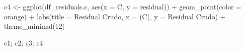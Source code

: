 \documentclass[
  letterpaper,
  DIV=11,
  numbers=noendperiod]{scrartcl}
\newenvironment{Shaded}{\begin{snugshade}}{\end{snugshade}}
\newcommand{\AttributeTok}[1]{\textcolor[rgb]{0.40,0.45,0.13}{#1}}
\newcommand{\DecValTok}[1]{\textcolor[rgb]{0.68,0.00,0.00}{#1}}
\newcommand{\FunctionTok}[1]{\textcolor[rgb]{0.28,0.35,0.67}{#1}}
\newcommand{\NormalTok}[1]{\textcolor[rgb]{0.00,0.23,0.31}{#1}}
\newcommand{\OtherTok}[1]{\textcolor[rgb]{0.00,0.23,0.31}{#1}}
\newcommand{\SpecialCharTok}[1]{\textcolor[rgb]{0.37,0.37,0.37}{#1}}
\newcommand{\StringTok}[1]{\textcolor[rgb]{0.13,0.47,0.30}{#1}}
\begin{document}
\begin{Shaded}
\begin{Highlighting}[]
\NormalTok{c4 }\OtherTok{\textless{}{-}} \FunctionTok{ggplot}\NormalTok{(df\_residuals.c, }\FunctionTok{aes}\NormalTok{(}\AttributeTok{x =}\NormalTok{ C, }\AttributeTok{y =}\NormalTok{ residual)) }\SpecialCharTok{+}
    \FunctionTok{geom\_point}\NormalTok{(}\AttributeTok{color =} \StringTok{\textquotesingle{}orange\textquotesingle{}}\NormalTok{) }\SpecialCharTok{+}
    \FunctionTok{labs}\NormalTok{(}\AttributeTok{title =} \StringTok{\textquotesingle{}Residual Crudo\textquotesingle{}}\NormalTok{, }\AttributeTok{x =} \StringTok{\textquotesingle{}(C)\textquotesingle{}}\NormalTok{, }\AttributeTok{y =} \StringTok{\textquotesingle{}Residual Crudo\textquotesingle{}}\NormalTok{) }\SpecialCharTok{+}
    \FunctionTok{theme\_minimal}\NormalTok{(}\DecValTok{12}\NormalTok{)}
\end{Highlighting}
\end{Shaded}

\begin{Shaded}
\begin{Highlighting}[]
\NormalTok{c1; c2; c3; c4}
\end{Highlighting}
\end{Shaded}
\end{document}
